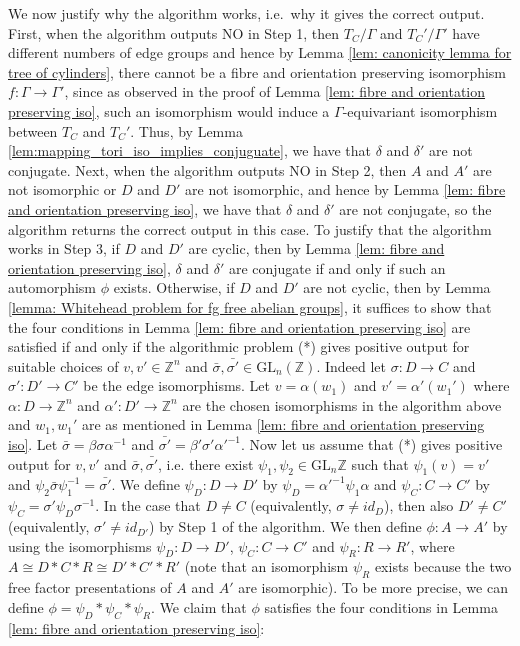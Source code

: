 \documentclass{amsart}
\newcommand{\Z}{\mathbb{Z}}
\theoremstyle{plain}
\theoremstyle{definition}
\theoremstyle{remark}
\begin{document}
We now justify why the algorithm works, i.e.\ why it gives the correct output. First, when the algorithm outputs NO in Step 1, then $T_C / \Gamma$ and $T_C' / \Gamma'$ have different numbers of edge groups and hence by Lemma \ref{lem: canonicity lemma for tree of cylinders}, there cannot be a fibre and orientation preserving isomorphism $f: \Gamma \to \Gamma'$, since as observed in the proof of Lemma \ref{lem: fibre and orientation preserving iso}, such an isomorphism would induce a $\Gamma$-equivariant isomorphism between $T_C$ and $T_C'$. Thus, by Lemma \ref{lem:mapping_tori_iso_implies_conjuguate}, we have that $\delta$ and $\delta'$ are not conjugate. Next, when the algorithm outputs NO in Step 2, then $A$ and $A'$ are not isomorphic or $D$ and $D'$ are not isomorphic, and hence by Lemma \ref{lem: fibre and orientation preserving iso}, we have that $\delta$ and $\delta'$ are not conjugate, so the algorithm returns the correct output in this case. To justify that the algorithm works in Step 3, if $D$ and $D'$ are cyclic, then by Lemma \ref{lem: fibre and orientation preserving iso}, $\delta$ and $\delta'$ are conjugate if and only if such an automorphism $\phi$ exists. Otherwise, if $D$ and $D'$ are not cyclic, then by Lemma \ref{lemma: Whitehead problem for fg free abelian groups}, it suffices to show that the four conditions in Lemma \ref{lem: fibre and orientation preserving iso} are satisfied if and only if the algorithmic problem (*) gives positive output for suitable choices of $v,v' \in \Z^n$ and $\bar{\sigma}, \bar{\sigma'} \in \mathrm{GL}_n(\Z)$. Indeed let $\sigma : D \to C$ and $\sigma' : D' \to C'$ be the edge isomorphisms. Let $v = \alpha (w_1)$ and $v' = \alpha' (w_1')$ where $\alpha: D \to \mathbb{Z}^n$ and $\alpha': D' \to \mathbb{Z}^n$ are the chosen isomorphisms in the algorithm above and $w_1, w_1'$ are as mentioned in Lemma \ref{lem: fibre and orientation preserving iso}. Let $\bar{\sigma} = \beta \sigma \alpha^{-1}$ and $\bar{\sigma'} = \beta' \sigma' \alpha'^{-1}$. Now let us assume that (*) gives positive output for $v,v'$ and $\bar{\sigma}, \bar{\sigma'}$, i.e. there exist $\psi_1, \psi_2 \in \mathrm{GL}_n\mathbb{Z}$ such that $\psi_1(v) = v'$ and $\psi_2 \bar{\sigma} \psi_1^{-1} = \bar{\sigma'}$. We define $\psi_D : D \to D'$ by $\psi_D = \alpha'^{-1} \psi_1 \alpha$ and $\psi_C : C \to C'$ by $\psi_C = \sigma' \psi_D \sigma^{-1}$. In the case that $D \neq C$ (equivalently, $\sigma \neq id_D$), then also $D' \neq C'$ (equivalently, $\sigma' \neq id_{D'}$) by Step 1 of the algorithm. We then define $\phi : A \to A'$ by using the isomorphisms $\psi_D : D \to D'$, $\psi_C : C \to C'$ and $\psi_R : R \to R'$, where $A \cong D*C*R \cong D'*C'*R'$ (note that an isomorphism $\psi_R$ exists because the two free factor presentations of $A$ and $A'$ are isomorphic). To be more precise, we can define $\phi = \psi_D * \psi_C * \psi_R$. We claim that $\phi$ satisfies the four conditions in Lemma \ref{lem: fibre and orientation preserving iso}:
\end{document}
